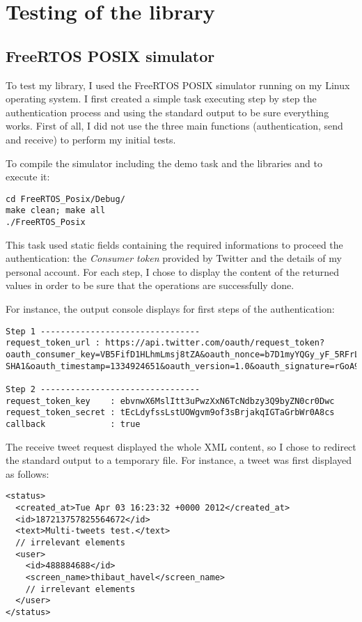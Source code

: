 \chapter{Testing of the library}


\section{FreeRTOS POSIX simulator}

\hspace{15mm}To test my library, I used the FreeRTOS POSIX simulator running on my Linux operating system. I first created a simple task executing step by step the authentication process and using the standard output to be sure everything works. First of all, I did not use the three main functions (authentication, send and receive) to perform my initial tests.

To compile the simulator including the demo task and the libraries and to execute it:
\begin{lstlisting}
cd FreeRTOS_Posix/Debug/
make clean; make all
./FreeRTOS_Posix
\end{lstlisting}

This task used static fields containing the required informations to proceed the authentication: the \textit{Consumer token} provided by Twitter and the details of my personal account. For each step, I chose to display the content of the returned values in order to be sure that the operations are successfully done.

For instance, the output console displays for first steps of the authentication:
\begin{lstlisting}
Step 1 --------------------------------
request_token_url : https://api.twitter.com/oauth/request_token?oauth_consumer_key=VB5FifD1HLhmLmsj8tZA&oauth_nonce=b7D1myYQGy_yF_5RFrLs0&oauth_signature_method=HMAC-SHA1&oauth_timestamp=1334924651&oauth_version=1.0&oauth_signature=rGoA99tkEd%2B7%2F2RpSvZOzm%2FqVWI%3D 

Step 2 --------------------------------
request_token_key    : ebvnwX6MslItt3uPwzXxN6TcNdbzy3Q9byZN0cr0Dwc 
request_token_secret : tEcLdyfssLstUOWgvm9of3sBrjakqIGTaGrbWr0A8cs 
callback             : true 
\end{lstlisting}

The receive tweet request displayed the whole XML content, so I chose to redirect the standard output to a temporary file. For instance, a tweet was first displayed as follows:\clearpage
\begin{lstlisting}
<status>
  <created_at>Tue Apr 03 16:23:32 +0000 2012</created_at>
  <id>187213757825564672</id>
  <text>Multi-tweets test.</text>
  // irrelevant elements
  <user>
    <id>488884688</id>
    <screen_name>thibaut_havel</screen_name>
    // irrelevant elements
  </user>
</status>
\end{lstlisting}

